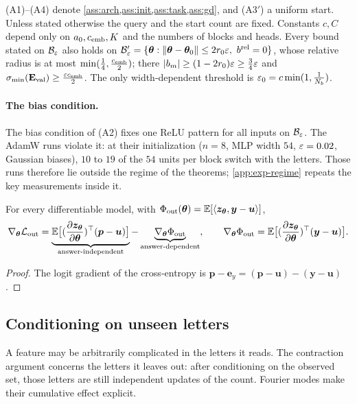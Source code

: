(A1)--(A4) denote \cref{ass:arch,ass:init,ass:task,ass:gd}, and (A3$'$) a uniform start. Unless stated otherwise the query and the start
count are fixed. Constants $c,C$ depend only on $a_0,c_{\mathrm{emb}},K$ and the numbers of blocks and heads. Every bound stated on $\mathcal B_{\varepsilon}$ also
holds on $\initball'=\{\bm\theta:\|\bm\theta-\bm\theta_0\|\le2\ballradius\initscale,\ \brel=0\}$, whose relative radius is at most $\min(\frac{1}{4},\frac{c_{\mathrm{emb}}}{2})$; there
$|b_m|\ge(1-2r_0)\varepsilon\ge\frac{3}{4}\varepsilon$ and $\sigma_{\min}(\mathbf E_{\mathrm{val}})\ge\frac{\varepsilon c_{\mathrm{emb}}}{2}$. The only width-dependent threshold is $\varepsilon_0=c\min(1,\frac{1}{N_b})$.

\paragraph{The bias condition.}\label{rem:two-block-bias} The bias condition of (A2) fixes one ReLU pattern for all inputs on $\mathcal B_{\varepsilon}$. The AdamW runs violate it: at their initialization
($n=8$, MLP width $54$, $\varepsilon=0.02$, Gaussian biases), $10$ to $19$ of the $54$ units per block switch with the letters. Those
runs therefore lie outside the regime of the theorems; \cref{app:exp-regime} repeats the key measurements inside it.


\begin{lemma}
\label{lem:gradient-split}
For every differentiable model, with $\Phi_{\mathrm{out}}(\bm\theta)=\mathbb E[\langle\bm z_{\bm\theta},\bm y-\bm u\rangle]$,
\[
 \nabla_{\bm\theta}\Lout=\underbrace{\E\bigl[(\Jz)^\top(\bm p-\bm u)\bigr]}_{\text{answer-independent}}-\underbrace{\nabla_{\bm\theta}\outcredit}_{\text{answer-dependent}},\qquad
 \nabla_{\bm\theta}\outcredit=\E\bigl[(\Jz)^\top(\bm y-\bm u)\bigr].
\]
\end{lemma}

\begin{proof}
The logit gradient of the cross-entropy is $\bm p-\bm e_y=(\bm p-\bm u)-(\bm y-\bm u)$.
\end{proof}

\subsection{Conditioning on unseen letters}
\label{app:target-spectrum}

A feature may be arbitrarily complicated in the letters it reads. The contraction argument concerns the letters it leaves out:
after conditioning on the observed set, those letters are still independent updates of the count. Fourier modes make their
cumulative effect explicit.

